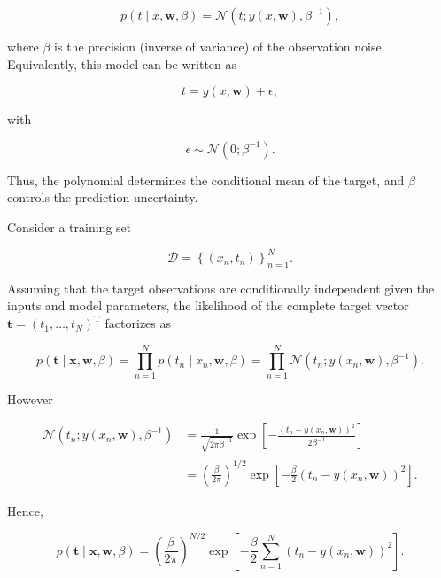 \documentclass[10pt,twocolumn]{memoir}
\begin{document}
\begin{equation}
    p(t\mid x,\mathbf{w},\beta) = \mathcal{N}\left(t;y(x,\mathbf{w}),\beta^{-1}\right),
\end{equation}

where $\beta$ is the precision (inverse of variance) of the observation noise. Equivalently, this model can be written as

\begin{equation}
    t = y(x,\mathbf{w}) + \epsilon,
\end{equation}

with

\begin{equation}
    \epsilon \sim \mathcal{N}(0;\beta^{-1}).
\end{equation}

Thus, the polynomial determines the conditional mean of the target, and $\beta$ controls the prediction uncertainty.

Consider a training set

\begin{equation}
    \mathcal{D} = \left\{(x_n,t_n)\right\}_{n=1}^{N}.
\end{equation}

Assuming that the target observations are conditionally independent given the inputs and model parameters, the likelihood of the complete target vector $\mathbf{t}=(t_1,\ldots,t_N)^{\mathrm{T}}$ factorizes as

\begin{equation}
    p(\mathbf{t}\mid\mathbf{x},\mathbf{w},\beta) = \prod_{n=1}^{N} p(t_n\mid x_n,\mathbf{w},\beta)
    = \prod_{n=1}^{N}\mathcal{N}\left(t_n;y(x_n,\mathbf{w}),\beta^{-1}\right).
\end{equation}

However

\begin{equation}
\begin{aligned}
    \mathcal{N}
    \left(t_n;y(x_n,\mathbf{w}),\beta^{-1}\right)
    &=
    \frac{1}{\sqrt{2\pi\beta^{-1}}}\exp\left[-\frac{\left(t_n-y(x_n,\mathbf{w})\right)^2}{2\beta^{-1}}\right] \\
    &=
    \left(\frac{\beta}{2\pi}\right)^{1/2}\exp\left[-\frac{\beta}{2}\left(t_n-y(x_n,\mathbf{w})\right)^2\right].
\end{aligned}
\end{equation}

Hence,

\begin{equation}
    p(\mathbf{t}\mid\mathbf{x},\mathbf{w},\beta) = \left(\frac{\beta}{2\pi}\right)^{N/2}\exp\left[-\frac{\beta}{2}\sum_{n=1}^{N}\left(t_n-y(x_n,\mathbf{w})\right)^2\right].
\label{eq:c1_gaussian_likelihood}
\end{equation}
\end{document}
